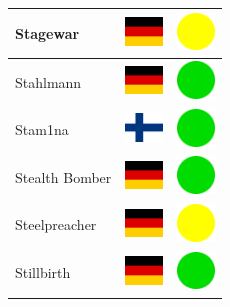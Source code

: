 \documentclass[12pt, a4paper, twoside]{report}
\begin{document}
\begin{center}
\begin{longtable}{|p{5cm}|p{2cm}|p{2cm}|}
 Stagewar                                                   & \includegraphics[width=1cm]{../img/flags/de} &   \includegraphics[width=1cm]{../likes/m} \\ \hline
 Stahlmann                                                  & \includegraphics[width=1cm]{../img/flags/de} &   \includegraphics[width=1cm]{../likes/y} \\ \hline
 Stam1na                                                    & \includegraphics[width=1cm]{../img/flags/fi} &   \includegraphics[width=1cm]{../likes/y} \\ \hline
 Stealth Bomber                                             & \includegraphics[width=1cm]{../img/flags/de} &   \includegraphics[width=1cm]{../likes/y} \\ \hline
 Steelpreacher                                              & \includegraphics[width=1cm]{../img/flags/de} &   \includegraphics[width=1cm]{../likes/m} \\ \hline
 Stillbirth                                                 & \includegraphics[width=1cm]{../img/flags/de} &   \includegraphics[width=1cm]{../likes/y} \\ \hline

\end{longtable}
\end{center}
\end{document}
